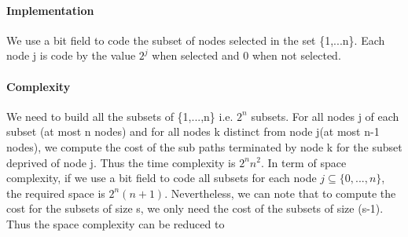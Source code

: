 \documentclass[../report.tex]{subfiles}
\begin{document}
\paragraph{Implementation}\hfill \break
We use a bit field to code the subset of nodes selected in the set \{1,...n\}.
Each node j is code by the value $2^j$ when selected and 0 when not selected. 

\paragraph{Complexity}\hfill \break
   We need to build all the subsets of \{1,...,n\} i.e. $2^n$ subsets. For all nodes j of each subset (at most n nodes) and for all nodes k distinct from node j(at most n-1 nodes), we compute the cost of the sub paths terminated by node k for the subset deprived of node j.
Thus the time complexity is $2^n n^2$.
\newline{} In term of space complexity, if we use a bit field to code all subsets for each node $j \subseteq \{0,...,n\}$, the required space is $2^n (n+1)$.
\newline{} Nevertheless, we can note that to compute the cost for the subsets of size s, we only need the cost of the subsets of size (s-1). Thus the space complexity can be reduced to 
\end{document}
